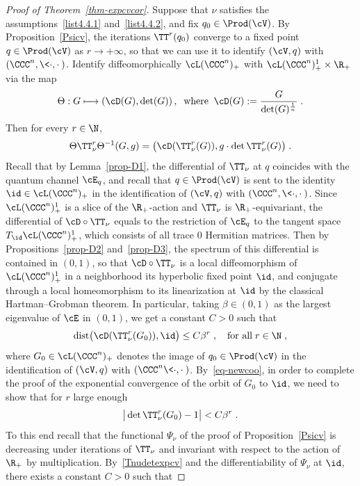 \begin{proof}[Proof of Theorem~\ref{thm-expcvcor}]
Suppose that $\nu$ satisfies the assumptions~\eqref{list4.4.1} and~\eqref{list4.4.2}, and fix $q_0\in\Prod(\cV)$. By Proposition~\ref{Psicv}, the iterations $\TT^r(q_0)$ converge to a fixed point $q\in\Prod(\cV)$ as $r \to +\infty$, so that we can use it to identify $(\cV,q)$ with $(\CCC^n,\<\cdot,\cdot\>)$. Identify diffeomorphically $\cL(\CCC^n)_+$ with $\cL(\CCC^n)_+^1 \times \R_+$ via the map
\[
\Theta: G \longmapsto\left(\cD(G),\det(G)\right),\;\;\text{where}\;\; \cD(G):=\frac{G}{\det(G)^{\frac{1}{n}}}\;.
\]
Then for every $r \in \N$,
\begin{equation}\label{eq-newcoo}
\Theta \TT^r_\nu \Theta^{-1} (G,g) =\big(\cD(\TT^r_\nu(G)), g \cdot \det\TT^r_\nu(G)\big)\;.
\end{equation}
Recall that by Lemma~\ref{prop-D1}, the differential of $\TT_\nu$ at $q$ coincides with the quantum channel $\cE_q$, and recall that $q\in\Prod(\cV)$ is sent to the identity $\id\in\cL(\CCC^n)_+$ in the identification of $(\cV,q)$ with $(\CCC^n,\<\cdot,\cdot\>)$. Since $\cL(\CCC^n)^1_+$ is a slice of the $\R_+$-action and $\TT_\nu$ is $\R_+$-equivariant, the differential of $\cD \circ \TT_\nu$ equals to the restriction of $\cE_q$ to the tangent space $T_\id\cL(\CCC^n)_+^1$, which consists of all trace $0$ Hermitian matrices. Then by Propositions~\ref{prop-D2} and~\ref{prop-D3}, the spectrum of this differential is contained in $(0,1)$, so that $\cD \circ \TT_\nu$ is a local diffeomorphism of $\cL(\CCC^n)_+^1$ in a neighborhood its hyperbolic fixed point $\id$, and conjugate through a local homeomorphism to its linearization at $\id$ by the classical Hartman--Grobman theorem. In particular, taking $\beta\in(0,1)$ as the largest eigenvalue of $\cE$ in $(0,1)$, we get a constant $C>0$ such that
\begin{equation}\label{Tnudetexpcv}
\textup{dist}
\big(\cD (\TT_\nu^r(G_0)),\id
\big)\leq C\beta^r\;,\quad\text{for all}\; r\in\N\;,
\end{equation}
where $G_0\in\cL(\CCC^n)_+$ denotes the image of $q_0\in\Prod(\cV)$ in the identification of $(\cV,q)$ with $(\CCC^n\<\cdot,\cdot\>)$. By~\eqref{eq-newcoo}, in order to complete the proof of the exponential convergence of the orbit of $G_0$ to $\id$, we need to show that for $r$ large enough
\begin{equation}\label{detcv}
\big|\det \TT^r_\nu(G_0)-1\big|<C\beta^r\;.
\end{equation}
To this end recall that the functional $\Psi_\nu$ of the proof of Proposition~\ref{Psicv} is decreasing under iterations of $\TT_\nu$ and invariant with respect to the action of $\R_+$ by multiplication. By~\eqref{Tnudetexpcv} and the differentiability of $\Psi_\nu$ at $\id$, there exists a constant $C>0$ such that

\end{proof}
